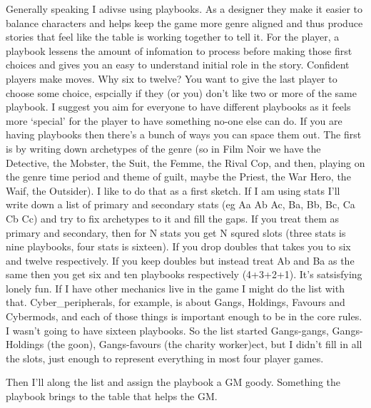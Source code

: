 \documentclass{tufte-handout}
\begin{document}
Generally speaking I adivse using playbooks. As a designer they make it easier to balance characters and helps keep the game more genre aligned and thus produce stories that feel like the table is working together to tell it. For the player, a playbook lessens the amount of infomation to process before making those first choices and gives you an easy to understand initial role in the story. Confident players make moves.
Why six to twelve? You want to give the last player to choose some choice, espcially if they (or you) don't like two or more of the same playbook. I suggest you aim for everyone to have different playbooks as it feels more `special' for the player to have something no-one else can do. 
If you are having playbooks then there's a bunch of ways you can space them out.  The first is by writing down archetypes of the genre (so in Film Noir we have the Detective, the Mobster, the Suit, the Femme, the Rival Cop, and then, playing on the genre time period and theme of guilt, maybe the Priest, the War Hero, the Waif, the Outsider). 
I like to do that as a first sketch. If I am using stats I'll write down a list of primary and secondary stats (eg Aa Ab Ac, Ba, Bb, Bc, Ca Cb Cc) and try to fix archetypes to it and fill the gaps. If you treat them as primary and secondary, then for N stats you get N squred slots (three stats is nine playbooks, four stats is sixteen). If you drop doubles that takes you to six and twelve respectively. If you keep doubles but instead treat Ab and Ba as the same then you get six and ten playbooks respectively (4+3+2+1). It's satsisfying lonely fun. 
If I have other mechanics live in the game I might do the list with that. Cyber\_peripherals, for example, is about Gangs, Holdings, Favours and Cybermods, and each of those things is important enough to be in the core rules. I wasn't going to have sixteen playbooks. So the list started Gangs-gangs, Gangs-Holdings (the goon), Gangs-favours (the charity worker)ect, but I didn't fill in all the slots, just enough to represent everything in most four player games.

Then I'll along the list and assign the playbook a GM goody. Something the playbook brings to the table that helps the GM.
\end{document}
